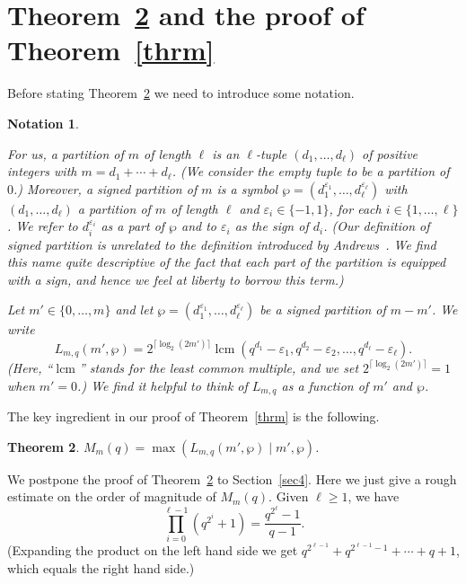 \documentclass{amsart}
\newtheorem{theorem}{Theorem}[section]
\newtheorem{notation}[theorem]{Notation}
\begin{document}
\section{Theorem~\ref{thrm2} and the proof of Theorem~\ref{thrm}}\label{sec2}

Before stating Theorem~\ref{thrm2} we need to introduce some notation.
\begin{notation}\label{not}{\rm For us, a partition  of $m$ of length $\ell$ is an  $\ell$-tuple $(d_1,\ldots,d_\ell)$ of positive integers with $m=d_1+\cdots+d_\ell$. (We consider the empty tuple to be a partition of $0$.)  Moreover, a signed partition of $m$ is a symbol $\wp=(d_1^{\varepsilon_1},\ldots,d_\ell^{\varepsilon_\ell})$ with $(d_1,\ldots,d_\ell)$  a partition of $m$ of length $\ell$ and $\varepsilon_i\in \{-1,1\}$, for each $i\in \{1,\ldots,\ell\}$. We refer to $d_i^{\varepsilon_i}$ as a \textrm{part} of $\wp$ and to $\varepsilon_i$ as the \textrm{sign} of $d_i$. (Our definition of signed partition is unrelated to the definition introduced by Andrews~\cite[page~$567$]{Andrews}. We find this name quite descriptive of the fact that each part of the partition is equipped with a sign, and hence we feel at liberty to borrow this term.)

Let ${m'}\in \{0,\ldots,m\}$ and let $\wp=(d_1^{\varepsilon_1},\ldots,d_\ell^{\varepsilon_\ell})$ be a signed partition of $m-{m'}$. We write
$$L_{m,q}({m'},\wp)=2^{\lceil \log_2(2{m'})\rceil}{\mathop{\mathrm{lcm}}}(q^{d_1}-\varepsilon_1,q^{d_2}-\varepsilon_2,\ldots,q^{d_\ell}-\varepsilon_\ell).$$
(Here,  ``${\mathop{\mathrm{lcm}}}$'' stands for the least common multiple, and we set $2^{\lceil \log_2(2m')\rceil}=1$ when $m'=0$.) We find it helpful to think of $L_{m,q}$ as a function of ${m'}$ and $\wp$.}
\end{notation}

The key ingredient in our proof of Theorem~\ref{thrm} is the following.  

\begin{theorem}\label{thrm2}$M_m(q)=\max(L_{m,q}({m'},\wp)\mid {m'},\wp)$.
\end{theorem}

We postpone the proof of Theorem~\ref{thrm2} to Section~\ref{sec4}. Here we just give a rough estimate on the order of magnitude of $M_m(q)$.  
Given $\ell\geq 1$, we have 
\begin{equation}\label{eq0}
\prod_{i=0}^{\ell-1}(q^{2^i}+1)=\frac{q^{2^{\ell}}-1}{q-1}.
\end{equation}
(Expanding the product on the left hand side we get $q^{2^{\ell-1}}+q^{2^{\ell-1}-1}+\cdots +q+1$, which equals the right hand side.) 
\end{document}
